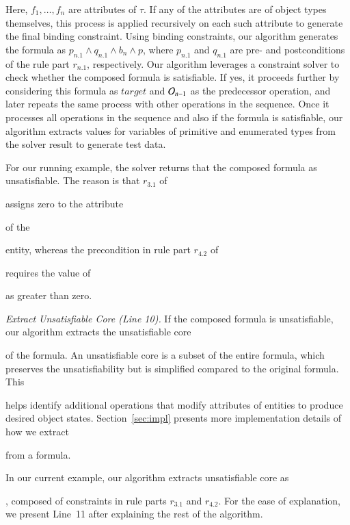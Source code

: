 Here, $f_1, \ldots , f_n$ are attributes of $\tau$. If any of the
attributes are of object types themselves, this process is applied
recursively on each such attribute to generate the final binding
constraint. Using binding constraints, our algorithm generates the formula as $p_{n.1} \wedge q_{n.1}
\wedge b_n \wedge p$, where $p_{n.1}$ and $q_{n.1}$ are pre- and postconditions
of the rule part $r_{n.1}$, respectively. Our algorithm leverages a 
constraint solver to check whether the composed formula is satisfiable.
If yes, it proceeds further by considering
this formula as $target$ and ${\cal O}_{n-1}$ as the predecessor operation,
and later repeats the same process with other operations in the sequence.
Once it processes all operations in the sequence and also if the formula is satisfiable,
our algorithm extracts values for variables of primitive and enumerated types
from the solver result to generate test data. 

For our running example, the solver returns that the composed formula
as unsatisfiable. The reason is that $r_{3.1}$ of \subject{CreateOrder} 
assigns zero to the attribute \subject{total} of the \subject{Order} entity, whereas the
precondition in rule part $r_{4.2}$ of \subject{GenerateInvoice} requires the value of \subject{total} 
as greater than zero.

\textit{Extract Unsatisfiable Core (Line 10).} If the composed formula is unsatisfiable,
our algorithm extracts the unsatisfiable core \subject{ucore} of the formula. An unsatisfiable core 
is a subset of the entire formula, which preserves the unsatisfiability but is simplified
compared to the original formula. This \subject{ucore} helps identify additional operations that modify attributes of entities
to produce desired object states. Section~\ref{sec:impl} presents more implementation
details of how we extract \subject{ucore} from a formula.

In our current example, our algorithm extracts 
unsatisfiable core as \subject{ord.total = 0 $\wedge$ ord.total > 0}, composed of constraints
in rule parts $r_{3.1}$ and $r_{4.2}$. For the ease
of explanation, we present Line~11 after explaining
the rest of the algorithm.


